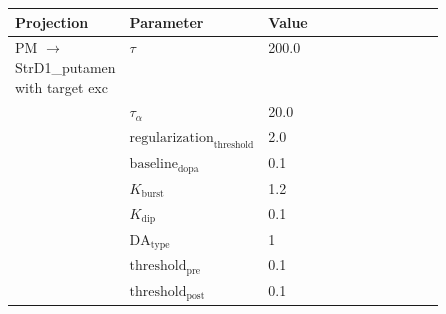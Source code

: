 \documentclass{article}
\begin{document}
\noindent
\begin{tabularx}{\linewidth}{|p{0.25\linewidth}|p{0.25\linewidth}|X|}\hline
\textbf{Projection} & \textbf{Parameter} & \textbf{Value}   \\ \hline

    PM  $\rightarrow$ StrD1\_putamen with target exc & $\tau$        & 200.0  \\ \hline

     & $\tau_\alpha$        & 20.0  \\ \hline

     & ${\text{regularization}}_{\text{threshold}}$        & 2.0  \\ \hline

     & ${\text{baseline}}_{\text{dopa}}$        & 0.1  \\ \hline

     & $K_{\text{burst}}$        & 1.2  \\ \hline

     & $K_{\text{dip}}$        & 0.1  \\ \hline

     & ${\text{DA}}_{\text{type}}$        & 1  \\ \hline

     & ${\text{threshold}}_{\text{pre}}$        & 0.1  \\ \hline

     & ${\text{threshold}}_{\text{post}}$        & 0.1  \\ \hline

\end{tabularx}

\vspace{2ex}
\end{document}
